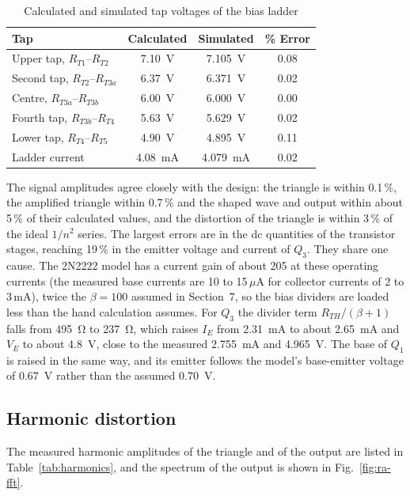 \documentclass[12pt,a4paper]{article}
\begin{document}
	\begin{table}[H]
		\centering
		\caption{Calculated and simulated tap voltages of the bias ladder}
		\label{tab:taps}
		\renewcommand{\arraystretch}{1.25}
		\begin{tabular}{|l|c|c|c|}
			\hline
			\rowcolor{black!12}\textbf{Tap} & \textbf{Calculated} & \textbf{Simulated} & \textbf{\% Error} \\
			\hline
			Upper tap, $R_{T1}$--$R_{T2}$ & \SI{7.10}{\volt} & \SI{7.105}{\volt} & 0.08 \\
			\hline
			Second tap, $R_{T2}$--$R_{T3a}$ & \SI{6.37}{\volt} & \SI{6.371}{\volt} & 0.02 \\
			\hline
			Centre, $R_{T3a}$--$R_{T3b}$ & \SI{6.00}{\volt} & \SI{6.000}{\volt} & 0.00 \\
			\hline
			Fourth tap, $R_{T3b}$--$R_{T4}$ & \SI{5.63}{\volt} & \SI{5.629}{\volt} & 0.02 \\
			\hline
			Lower tap, $R_{T4}$--$R_{T5}$ & \SI{4.90}{\volt} & \SI{4.895}{\volt} & 0.11 \\
			\hline
			Ladder current & \SI{4.08}{\milli\ampere} & \SI{4.079}{\milli\ampere} & 0.02 \\
			\hline
		\end{tabular}
	\end{table}

	The signal amplitudes agree closely with the design: the triangle is within 0.1\,\%, the amplified triangle within 0.7\,\% and the shaped wave and output within about 5\,\% of their calculated values, and the distortion of the triangle is within 3\,\% of the ideal $1/n^2$ series. The largest errors are in the dc quantities of the transistor stages, reaching 19\,\% in the emitter voltage and current of $Q_3$. They share one cause. The 2N2222 model has a current gain of about 205 at these operating currents (the measured base currents are 10 to 15\,$\mu$A for collector currents of 2 to 3\,mA), twice the $\beta=100$ assumed in Section~7, so the bias dividers are loaded less than the hand calculation assumes. For $Q_3$ the divider term $R_{TH}/(\beta+1)$ falls from \SI{495}{\ohm} to \SI{237}{\ohm}, which raises $I_E$ from \SI{2.31}{\milli\ampere} to about \SI{2.65}{\milli\ampere} and $V_E$ to about \SI{4.8}{\volt}, close to the measured \SI{2.755}{\milli\ampere} and \SI{4.965}{\volt}. The base of $Q_1$ is raised in the same way, and its emitter follows the model's base-emitter voltage of \SI{0.67}{\volt} rather than the assumed \SI{0.70}{\volt}.

	\subsection{Harmonic distortion}
	The measured harmonic amplitudes of the triangle and of the output are listed in Table~\ref{tab:harmonics}, and the spectrum of the output is shown in Fig.~\ref{fig:ra-fft}.
\end{document}
